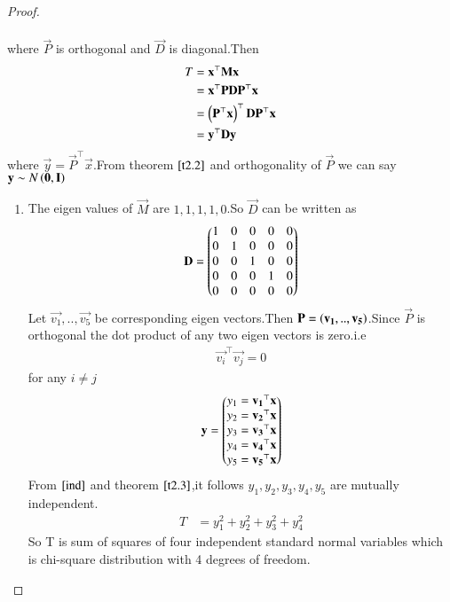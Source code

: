 \documentclass[journal,12pt,twocolumn]{IEEEtran}
\begin{document}
\begin{proof}
\begin{enumerate}
\begin{align}
\end{align}
where $\vec{P}$ is orthogonal and $\vec{D}$ is diagonal.Then
\begin{align}
    T&=\mathbf{x}^{\top}\mathbf{M}\mathbf{x}\\
    &=\mathbf{x}^{\top}\mathbf{P}\mathbf{D}\mathbf{P}^{\top}\mathbf{x}\\
    &=\left(\mathbf{P}^{\top}\mathbf{x}\right)^{\top}\mathbf{D}\mathbf{P}^{\top}\mathbf{x}\\
    &=\mathbf{y}^{\top}\mathbf{D}\mathbf{y}
\end{align}
where $\vec{y}=\vec{P}^{\top}\vec{x}$.From theorem $\ref{t2.2}$ and orthogonality of $\vec{P}$ we can say
$\mathbf{y}\sim N\left(\mathbf{0},\mathbf{I}\right)$
\begin{enumerate}
    \item The eigen values of $\vec{M}$ are $1,1,1,1,0$.So $\vec{D}$ can be written as
    \begin{align}
        \mathbf{D}=\begin{pmatrix}1&0&0&0&0\\
                       0&1&0&0&0\\
                       0&0&1&0&0\\
                       0&0&0&1&0\\
                       0&0&0&0&0\end{pmatrix}
    \end{align}
    Let $\vec{v_1},..,\vec{v_5}$ be corresponding eigen vectors.Then $\mathbf{P}=\left(\mathbf{v_1},..,\mathbf{v_5}\right)$.Since $\vec{P}$ is orthogonal the dot product of any two eigen vectors is zero.i.e
    \begin{align}
        \vec{v_i}^{\top}\vec{v_j}=0\label{ind}
    \end{align}
    for any $i\neq j$
    \begin{align}
        \mathbf{y}&=\begin{pmatrix}y_1=\mathbf{v_1}^{\top}\mathbf{x}\\
                       y_2=\mathbf{v_2}^{\top}\mathbf{x}\\
                       y_3=\mathbf{v_3}^{\top}\mathbf{x}\\
                       y_4=\mathbf{v_4}^{\top}\mathbf{x}\\
                       y_5=\mathbf{v_5}^{\top}\mathbf{x}\end{pmatrix}\\
    \end{align}
    From $\eqref{ind}$ and theorem $\ref{t2.3}$,it follows $y_1,y_2,y_3,y_4,y_5$ are mutually independent.
    \begin{align}
         T&=y_1^2+y_2^2+y_3^2+y_4^2 
    \end{align}
    So T is sum of squares of four independent standard normal variables which is chi-square distribution with 4 degrees of freedom.
\end{enumerate}
\end{enumerate}
\end{proof}
\end{document}
